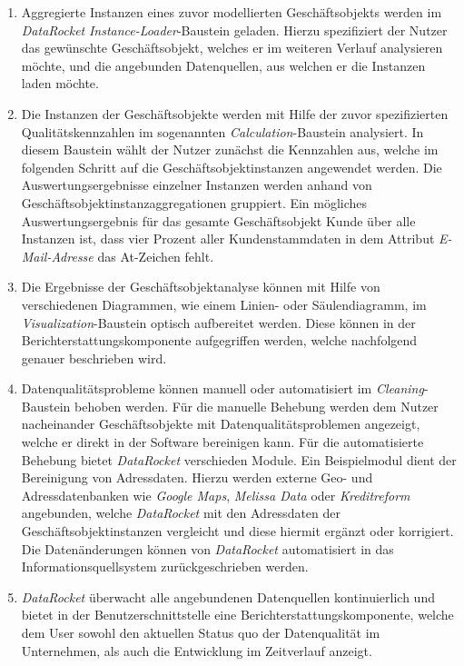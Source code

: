 \documentclass[
  language=german, %
  type=bachelor,%
  ngerman
]{isthesis}
\begin{document}
\begin{content}
\begin{enumerate}
		\item Aggregierte Instanzen eines zuvor modellierten Geschäftsobjekts
		werden im \textit{DataRocket} \textit{Instance-Loader}-Baustein geladen.
		Hierzu spezifiziert der Nutzer das gewünschte Geschäftsobjekt, welches er
		im weiteren Verlauf analysieren möchte, und die angebunden Datenquellen,
		aus welchen er die Instanzen laden möchte.

		\item Die Instanzen der Geschäftsobjekte werden mit Hilfe der zuvor
		spezifizierten Qualitätskennzahlen im sogenannten
		\textit{Calculation}-Baustein analysiert. In diesem Baustein wählt der
		Nutzer zunächst die Kennzahlen aus, welche im folgenden Schritt auf die
		Geschäftsobjektinstanzen angewendet werden. Die Auswertungsergebnisse
		einzelner Instanzen werden anhand von Geschäftsobjektinstanzaggregationen
		gruppiert. Ein mögliches Auswertungsergebnis für das gesamte
		Geschäftsobjekt Kunde über alle Instanzen ist, dass vier Prozent aller
		Kundenstammdaten in dem Attribut \textit{E-Mail-Adresse} das At-Zeichen
		fehlt.

		\item Die Ergebnisse der Geschäftsobjektanalyse können mit Hilfe von
		verschiedenen Diagrammen, wie \zB{} einem Linien- oder Säulendiagramm, im
		\textit{Visualization}-Baustein optisch aufbereitet werden. Diese können in
		der Berichterstattungskomponente aufgegriffen werden, welche nachfolgend
		genauer beschrieben wird.

		\item Datenqualitätsprobleme können manuell oder automatisiert im
		\textit{Cleaning}-Baustein behoben werden. Für die manuelle Behebung werden
		dem Nutzer nacheinander Geschäftsobjekte mit Datenqualitätsproblemen
		angezeigt, welche er direkt in der Software bereinigen kann. Für die
		automatisierte Behebung bietet \textit{DataRocket} verschieden Module. Ein
		Beispiel\-modul dient der Bereinigung von Adressdaten. Hierzu werden
		externe Geo- und Adressdatenbanken wie \zB{} \textit{Google Maps},
		\textit{Melissa Data} oder \textit{Kreditreform} angebunden, welche
		\textit{DataRocket} mit den Adressdaten der Geschäftsobjektinstanzen
		vergleicht und diese hiermit \ggf{} ergänzt oder korrigiert. Die
		Datenänderungen können von \textit{DataRocket} automatisiert in das
		Informationsquellsystem zurückgeschrieben werden.

    \item \textit{DataRocket} überwacht alle angebundenen Datenquellen
      kontinuierlich und bietet in der Benutzerschnittstelle eine
      Berichterstattungskomponente, welche dem User sowohl den aktuellen Status
      quo der Datenqualität im Unternehmen, als auch die Entwicklung im
      Zeitverlauf anzeigt.
	\end{enumerate}


\end{content}
\end{document}
